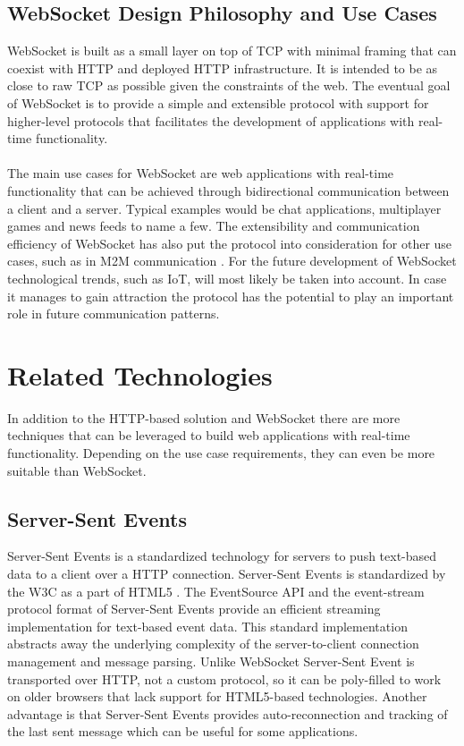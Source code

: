 \subsection{WebSocket Design Philosophy and Use Cases}

WebSocket is built as a small layer on top of TCP with minimal framing that can coexist with HTTP and deployed HTTP infrastructure. It is intended to be as close to raw TCP as possible given the constraints of the web. The eventual goal of WebSocket is to provide a simple and extensible protocol with support for higher-level protocols that facilitates the development of applications with real-time functionality.
\\ \\
The main use cases for WebSocket are web applications with real-time functionality that can be achieved through bidirectional communication between a client and a server. Typical examples would be chat applications, multiplayer games and news feeds to name a few. The extensibility and communication efficiency of WebSocket has also put the protocol into consideration for other use cases, such as in M2M communication \cite{perez2013electric,doukas2015providing}. For the future development of WebSocket technological trends, such as IoT, will most likely be taken into account. In case it manages to gain attraction the protocol has the potential to play an important role in future communication patterns.

\section{Related Technologies}

In addition to the HTTP-based solution and WebSocket there are more techniques that can be leveraged to build web applications with real-time functionality. Depending on the use case requirements, they can even be more suitable than WebSocket.

\subsection{Server-Sent Events}

Server-Sent Events is a standardized technology for servers to push text-based data to a client over a HTTP connection. Server-Sent Events is standardized by the W3C as a part of HTML5 \cite{hickson2009server}. The EventSource API and the event-stream protocol format of Server-Sent Events provide an efficient streaming implementation for text-based event data. This standard implementation abstracts away the underlying complexity of the server-to-client connection management and message parsing. Unlike WebSocket Server-Sent Event is transported over HTTP, not a custom protocol, so it can be poly-filled to work on older browsers that lack support for HTML5-based technologies. Another advantage is that Server-Sent Events provides auto-reconnection and tracking of the last sent message which can be useful for some applications.

